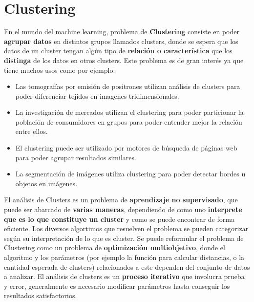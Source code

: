 \documentclass[11pt,a4paper]{article}
\begin{document}
\section{Clustering}
En el mundo del machine learning, problema de \textbf{Clustering} consiste en poder \textbf{agrupar datos} en distintos grupos llamados clusters, donde se espera que los datos de un cluster tengan algún tipo de \textbf{relación o característica} que los \textbf{distinga} de los datos en otros clusters. Este problema es de gran interés ya que tiene muchos usos como por ejemplo:
\begin{itemize}
	\item Las tomografías por emisión de positrones utilizan análisis de clusters para poder diferenciar tejidos en imagenes tridimensionales.
	\item La investigación de mercados utilizan el clustering para poder particionar la población de consumidores en grupos para poder entender mejor la relación entre ellos.
	\item El clustering puede ser utilizado por motores de búsqueda de páginas web para poder agrupar resultados similares.
	\item La segmentación de imágenes utiliza clustering para poder detectar bordes u objetos en imágenes.
\end{itemize}
El análisis de Clusters es un problema de \textbf{aprendizaje no supervisado}, que puede ser abarcado de \textbf{varias maneras}, dependiendo de como uno \textbf{interprete que es lo que constituye un cluster} y como se puede encontrar de forma eficiente. Los diversos algortimos que resuelven el problema se pueden categorizar según su interpretación de lo que es cluster.
Se puede reformular el problema de Clustering como un problema de \textbf{optimización multiobjetivo}, donde el algoritmo y los parámetros (por ejemplo la función para calcular distancias, o la cantidad esperada de clusters) relacionados a este dependen del conjunto de datos a analizar. El análisis de clusters es un \textbf{proceso iterativo} que involucra prueba y error, generalmente es necesario modificar parámetros hasta conseguir los resultados satisfactorios.
%
%
\end{document}
